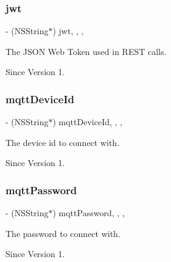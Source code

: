 \subsubsection{\texorpdfstring{jwt}{jwt}}
{\footnotesize\ttfamily -\/ (N\+S\+String$\ast$) jwt\hspace{0.3cm}{\ttfamily [read]}, {\ttfamily [write]}, {\ttfamily [nonatomic]}, {\ttfamily [copy]}}



The J\+S\+ON Web Token used in R\+E\+ST calls. 

\begin{DoxySince}{Since}
Version 1. 
\end{DoxySince}
\hypertarget{class_x_i_access_a74e77064908603354f861fd0d5fa5333}{}\label{class_x_i_access_a74e77064908603354f861fd0d5fa5333} 
\subsubsection{\texorpdfstring{mqtt\+Device\+Id}{mqttDeviceId}}
{\footnotesize\ttfamily -\/ (N\+S\+String$\ast$) mqtt\+Device\+Id\hspace{0.3cm}{\ttfamily [read]}, {\ttfamily [write]}, {\ttfamily [nonatomic]}, {\ttfamily [copy]}}



The device id to connect with. 

\begin{DoxySince}{Since}
Version 1. 
\end{DoxySince}
\hypertarget{class_x_i_access_a04c660fd582a30ad70590859fa064ffe}{}\label{class_x_i_access_a04c660fd582a30ad70590859fa064ffe} 
\subsubsection{\texorpdfstring{mqtt\+Password}{mqttPassword}}
{\footnotesize\ttfamily -\/ (N\+S\+String$\ast$) mqtt\+Password\hspace{0.3cm}{\ttfamily [read]}, {\ttfamily [write]}, {\ttfamily [nonatomic]}, {\ttfamily [copy]}}



The password to connect with. 

\begin{DoxySince}{Since}
Version 1. 
\end{DoxySince}
\hypertarget{class_x_i_access_ab5ba2ba4a7e62564a4a2494a0b911bc5}{}\label{class_x_i_access_ab5ba2ba4a7e62564a4a2494a0b911bc5} 
